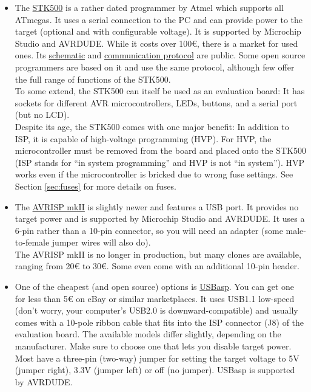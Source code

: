 \documentclass{article}
\begin{document}
\begin{itemize}
\item The \href{https://www.microchip.com/en-us/development-tool/atstk500}{STK500} is a rather dated programmer by Atmel which supports all ATmegas. It uses a serial connection to the PC and can provide power to the target (optional and with configurable voltage). It is supported by Microchip Studio and AVRDUDE. While it costs over 100\euro, there is a market for used ones. Its \href{http://atmel-studio-doc.s3-website-us-east-1.amazonaws.com/webhelp/GUID-D5634D24-82FD-4396-A28E-8A0F82B6FDE5-en-US-1/index.html}{schematic} and \href{https://www.microchip.com/content/dam/mchp/documents/OTH/ApplicationNotes/ApplicationNotes/doc2525.pdf}{communication protocol} are public. Some open source programmers are based on it and use the same protocol, although few offer the full range of functions of the STK500. \\
To some extend, the STK500 can itself be used as an evaluation board: It has sockets for different AVR microcontrollers, LEDs, buttons, and a serial port (but no LCD). \\
Despite its age, the STK500 comes with one major benefit: In addition to ISP, it is capable of high-voltage programming (HVP). For HVP, the microcontroller must be removed from the board and placed onto the STK500 (ISP stands for ``in system programming'' and HVP is not ``in system''). HVP works even if the microcontroller is bricked due to wrong fuse settings. See Section \ref{sec:fuses} for more details on fuses. 
\item The \href{https://www.microchip.com/en-us/development-tool/atavrisp2}{AVRISP mkII} is slightly newer and features a USB port. It provides no target power and is supported by Microchip Studio and AVRDUDE. It uses a 6-pin rather than a 10-pin connector, so you will need an adapter (some male-to-female jumper wires will also do). \\
The AVRISP mkII is no longer in production, but many clones are available, ranging from 20\euro{} to 30\euro. Some even come with an additional 10-pin header. 
\item One of the cheapest (and open source) options is \href{https://www.fischl.de/usbasp/}{USBasp}. You can get one for less than 5\euro{} on eBay or similar marketplaces. It uses USB1.1 low-speed (don't worry, your computer's USB2.0 is downward-compatible) and usually comes with a 10-pole ribbon cable that fits into the ISP connector (J8) of the evaluation board. The available models differ slightly, depending on the manufacturer. Make sure to choose one that lets you disable target power. Most have a three-pin (two-way) jumper for setting the target voltage to 5V (jumper right), 3.3V (jumper left) or off (no jumper). USBasp is supported by AVRDUDE. 

\end{itemize}
\end{document}

